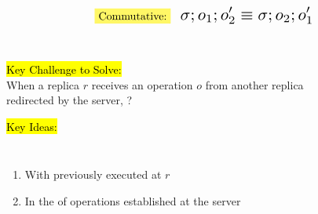 \begin{frame}{}

  \begin{equation*}
    \text{\hl{Commutative:}\;\; \resizebox{0.35\textwidth}{!}{$\sigma; o_1; o_2' \equiv \sigma; o_2; o_1'$}}
  \end{equation*}

  \centerline{}
\end{frame}

\begin{frame}{}
  \begin{center}
     \\[8pt]

    \resizebox{0.60\textwidth}{!}{}
  \end{center}
\end{frame}

\begin{frame}{}
  \begin{center}
    \hl{Key Challenge to Solve:} \\[8pt]
    When a replica $r$ receives an operation $o$ from another replica \\ redirected by the server,
    ?
  
    \pause
    \vspace{0.80cm}

    \pause
    \vspace{0.80cm}

    \hl{Key Ideas:} \\[3pt]
    \begin{columns}
	\begin{enumerate}
	  \item With  previously executed at $r$
	  \item In the  of operations established at the server
	\end{enumerate}
    \end{columns}
  \end{center}
\end{frame}

